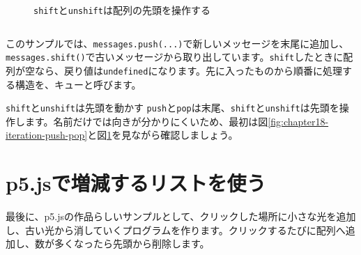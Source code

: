 \begin{figure}[htbp]
    \centering
    \caption{\texttt{shift}と\texttt{unshift}は配列の先頭を操作する}
    \label{fig:chapter18-iteration-shift-unshift}
\end{figure}

\begin{listing}[htbp]
\inputminted{ts}{typescript-p5/listings/chapter18-iteration/shift-unshift-queue.ts}
\caption{\texttt{shift}と\texttt{push}でメッセージを古い順に処理する（\texttt{chapter18-iteration/shift-unshift-queue.ts}）}
\label{lst:chapter18-iteration-shift-unshift-queue}
\end{listing}

このサンプルでは、\texttt{messages.push(...)}で新しいメッセージを末尾に追加し、\texttt{messages.shift()}で古いメッセージから取り出しています。\texttt{shift}したときに配列が空なら、戻り値は\texttt{undefined}になります。先に入ったものから順番に処理する構造を、キューと呼びます。

\begin{notebox}{\texttt{shift}と\texttt{unshift}は先頭を動かす}
\texttt{push}と\texttt{pop}は末尾、\texttt{shift}と\texttt{unshift}は先頭を操作します。名前だけでは向きが分かりにくいため、最初は図\ref{fig:chapter18-iteration-push-pop}と図\ref{fig:chapter18-iteration-shift-unshift}を見ながら確認しましょう。
\end{notebox}

\section{p5.jsで増減するリストを使う}

最後に、p5.jsの作品らしいサンプルとして、クリックした場所に小さな光を追加し、古い光から消していくプログラムを作ります。クリックするたびに配列へ追加し、数が多くなったら先頭から削除します。

\begin{listing}[htbp]
\inputminted[firstline=1,lastline=35]{ts}{typescript-p5/listings/chapter18-iteration/click-sparkles.ts}
\caption{クリックで追加される光のクラス（\texttt{chapter18-iteration/click-sparkles.ts}）}
\label{lst:chapter18-iteration-sparkle-class}
\end{listing}

